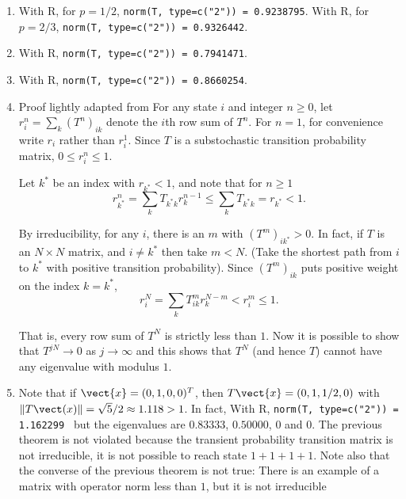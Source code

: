 \documentclass[12pt]{article}
\begin{document}
\begin{solution}
    \begin{enumerate}[label=(\alph*)]
    \item
        With R, for \( p=1/2 \), \texttt{norm(T, type=c("2")) =
        0.9238795}. With R, for \( p=2/3 \), \texttt{norm(T, type=c("2"))
        = 0.9326442}.
    \item
        With R, \texttt{norm(T, type=c("2")) = 0.7941471}.
    \item
        With R, \texttt{norm(T, type=c("2")) = 0.8660254}.
    \item
        Proof lightly adapted from 
        For any state \( i \) and integer \( n \ge 0 \), let \( r_i^n =
        \sum_{k}(T^n)_{ik} \) denote the \( i \)th row sum of \( T^n \).
        For \( n=1 \), for convenience write \( r_i \) rather than \( r_i^1
        \).  Since \( T \) is a substochastic transition probability
        matrix, \( 0 \le r_i^n \le 1 \).

        Let \( k^{\ast} \) be an index with \( r_{k^{\ast}} < 1 \), and
        note that for \( n \ge 1 \)
        \[
            r_{k^{\ast}}^n = \sum_{k} T_{k^{\ast}k} r_k^{n-1} \le \sum_{k}
            T_{k^{\ast}k} = r_{k^{\ast}} < 1.
        \]

        By irreducibility, for any \( i \), there is an \( m \) with \(
        (T^m)_{ik^{\ast}}>0 \).  In fact, if \( T \) is an \( N \times N \)
        matrix, and \( i \ne k^{\ast} \) then take \( m<N \).  (Take the
        shortest path from \( i \) to \( k^{\ast} \) with positive
        transition probability).  Since \( (T^{m})_{ik}\) puts positive
        weight on the index \( k=k^{\ast} \),
        \[
            r_i^N = \sum_{k} T_{ik}^{m} r_k^{N-m} < r_i^m \le 1.
        \]

        That is, every row sum of \( T^N \) is strictly less than \( 1 \).
        Now it is possible to show that \( T^{jN} \to 0 \) as \( j \to
        \infty \) and this shows that \( T^N \) (and hence \( T \))
        cannot have any eigenvalue with modulus \( 1 \).
    \item
      Note that if \( \vect{x} = (0,1,0,0)^T \), then \( T\vect{x} =
      (0,1,1/2,0) \) with \( \| T\vect(x)\| = \sqrt{5}/2 \approx 1.118
      > 1 \).  In fact, 
      With R, \texttt{norm(T, type=c("2")) = 1.162299 } but the
        eigenvalues are \( 0.83333 \), \( 0.50000 \), \( 0 \) and \( 0 \).
        The previous theorem is not violated because the transient
        probability transition matrix is not irreducible, it is not
        possible to reach state \( 1+1+1+1 \).  Note also that the
        converse of the previous theorem is not true:  There is an
        example of a matrix with operator norm less than \( 1 \), but
        it is not irreducible 
\end{enumerate}
\end{solution}
\end{document}
